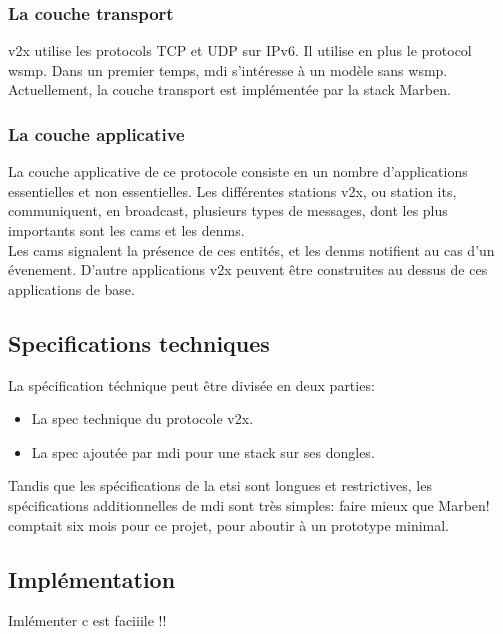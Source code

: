         \subsubsection{La couche transport}
            \gls{v2x} utilise les protocols TCP et UDP sur IPv6. Il utilise en plus
            le protocol \gls{wsmp}\cite{wave_spec}. Dans un premier temps, \gls{mdi}
            s'intéresse à un modèle sans \gls{wsmp}. Actuellement, la couche transport
            est implémentée par la stack Marben.

        \subsubsection{La couche applicative}
            La couche applicative de ce protocole consiste en un nombre d'applications
            essentielles et non essentielles. Les différentes stations \gls{v2x}, ou
            station \gls{its}, communiquent, en broadcast, plusieurs types de messages,
            dont les plus importants sont les \gls{cam}s et les \gls{denm}s.\\[0.3cm]
            Les \gls{cam}s signalent la présence de ces entités, et les \gls{denm}s
            notifient au cas d'un évenement. D'autre applications \gls{v2x} peuvent
            être construites au dessus de ces applications de base.

    \subsection{Specifications techniques}
        La spécification téchnique peut être divisée en deux parties:
        \begin{itemize}
            \renewcommand{\labelitemi}{$\bullet$}
            \item La spec technique du protocole \gls{v2x}\cite{v2x_spec}.
            \item La spec ajoutée par \gls{mdi} pour une stack sur ses dongles.
        \end{itemize}
        \bigskip
        Tandis que les spécifications de la \gls{etsi} sont longues et restrictives,
        les spécifications additionnelles de \gls{mdi} sont très simples: faire mieux
        que Marben!
        \mentor{} comptait six mois pour ce projet, pour aboutir à un prototype minimal.

    \subsection{Implémentation}
    Imlémenter c est faciiile !! 

